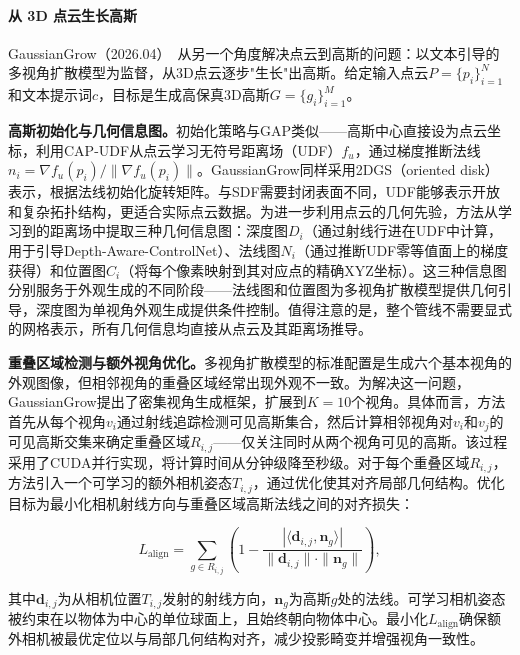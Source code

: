 \paragraph{从 3D 点云生长高斯}

GaussianGrow（2026.04）~\cite{2604_05721}从另一个角度解决点云到高斯的问题：以文本引导的多视角扩散模型为监督，从3D点云逐步"生长"出高斯。给定输入点云$P = \{p_i\}_{i=1}^N$和文本提示词$c$，目标是生成高保真3D高斯$G = \{g_i\}_{i=1}^M$。

\textbf{高斯初始化与几何信息图。}初始化策略与GAP类似——高斯中心直接设为点云坐标，利用CAP-UDF从点云学习无符号距离场（UDF）$f_u$，通过梯度推断法线$n_i = \nabla f_u(p_i) / \|\nabla f_u(p_i)\|$。GaussianGrow同样采用2DGS（oriented disk）表示，根据法线初始化旋转矩阵。与SDF需要封闭表面不同，UDF能够表示开放和复杂拓扑结构，更适合实际点云数据。为进一步利用点云的几何先验，方法从学习到的距离场中提取三种几何信息图：深度图$D_i$（通过射线行进在UDF中计算，用于引导Depth-Aware-ControlNet）、法线图$N_i$（通过推断UDF零等值面上的梯度获得）和位置图$C_i$（将每个像素映射到其对应点的精确XYZ坐标）。这三种信息图分别服务于外观生成的不同阶段——法线图和位置图为多视角扩散模型提供几何引导，深度图为单视角外观生成提供条件控制。值得注意的是，整个管线不需要显式的网格表示，所有几何信息均直接从点云及其距离场推导。

\textbf{重叠区域检测与额外视角优化。}多视角扩散模型的标准配置是生成六个基本视角的外观图像，但相邻视角的重叠区域经常出现外观不一致。为解决这一问题，GaussianGrow提出了密集视角生成框架，扩展到$K=10$个视角。具体而言，方法首先从每个视角$v_i$通过射线追踪检测可见高斯集合，然后计算相邻视角对$v_i$和$v_j$的可见高斯交集来确定重叠区域$R_{i,j}$——仅关注同时从两个视角可见的高斯。该过程采用了CUDA并行实现，将计算时间从分钟级降至秒级。对于每个重叠区域$R_{i,j}$，方法引入一个可学习的额外相机姿态$T_{i,j}$，通过优化使其对齐局部几何结构。优化目标为最小化相机射线方向与重叠区域高斯法线之间的对齐损失：

\begin{equation}
L_{\text{align}} = \sum_{g \in R_{i,j}} \left(1 - \frac{|\langle \mathbf{d}_{i,j}, \mathbf{n}_g \rangle|}{\|\mathbf{d}_{i,j}\| \cdot \|\mathbf{n}_g\|}\right),
\end{equation}

其中$\mathbf{d}_{i,j}$为从相机位置$T_{i,j}$发射的射线方向，$\mathbf{n}_g$为高斯$g$处的法线。可学习相机姿态被约束在以物体为中心的单位球面上，且始终朝向物体中心。最小化$L_{\text{align}}$确保额外相机被最优定位以与局部几何结构对齐，减少投影畸变并增强视角一致性。

